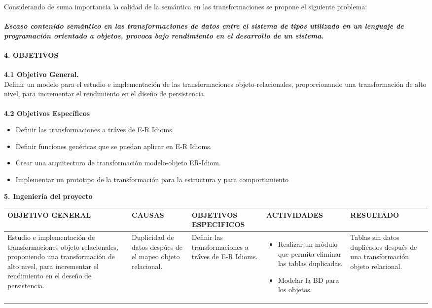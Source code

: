 \begin{flushleft}
\textrm{ Considerando de  suma importancia la calidad de la semántica en las transformaciones se propone el siguiente problema:
\\
\\ \textbf{\textit{Escaso contenido semántico en las transformaciones de datos entre el sistema de tipos utilizado en un lenguaje de programación orientado a objetos, provoca bajo rendimiento en el desarrollo de un sistema.}}
}
\\
\\ \textbf{4. OBJETIVOS}\\
\\ \textbf{4.1 Objetivo General.}
\\
\textrm{Definir un modelo para el estudio e implementación de las transformaciones objeto-relacionales, proporcionando una transformación de alto nivel, para incrementar el rendimiento en el diseño de persistencia.} \\
\\ \textbf{4.2 Objetivos Específicos}
\begin{itemize}
	\item Definir las transformaciones a tráves de E-R Idioms.
	\item Definir funciones genéricas que se puedan aplicar en E-R Idioms.
	\item Crear una arquitectura de transformación modelo-objeto ER-Idiom.
	\item Implementar un prototipo de la transformación para la estructura y para comportamiento	
\end{itemize}
\textbf{5. Ingeniería del proyecto}\\
 \begin{longtable}{|p{2.8cm}| p{2.8cm}| p{2.8cm}| p{2.8cm}| p{2.8cm}|}
    \hline
	OBJETIVO GENERAL & CAUSAS & OBJETIVOS ESPECIFICOS & ACTIVIDADES & RESULTADO \\ \hline
	\multirow {3}{2.8cm}{Estudio e implementación de transformaciones objeto relacionales, proponiendo una transformación de alto nivel, para incrementar el rendimiento en el deseño de persistencia.}
    & {Duplicidad de datos despúes de el mapeo objeto relacional.} & Definir las transformaciones a tráves de E-R Idioms. & 
	\parbox {2.8cm}{
	\begin{itemize}
		\item Realizar un módulo que permita eliminar las tablas duplicadas.
		\item Modelar la BD para los objetos.
	\end{itemize}}
	& Tablas sin datos duplicados después de una transformación objeto relacional.\\ \hline

\end{longtable}
\end{flushleft}
